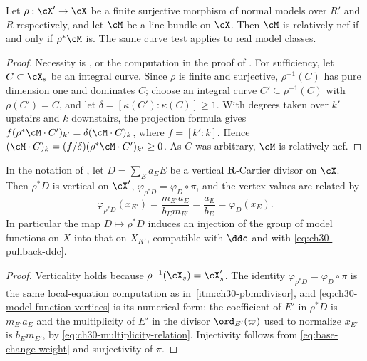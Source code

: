 \begin{lemma}
\label{lem:ch30-semipositivity-descends}
Let $\rho:\cX'\to\cX$ be a finite surjective morphism of normal models
over $R'$ and $R$ respectively, and let $\cM$ be a line bundle on
$\cX$.  Then $\cM$ is relatively nef if and only if $\rho^*\cM$ is.
The same curve test applies to real model classes.
\end{lemma}

\begin{proof}
Necessity is , or the computation in the proof of
.  For sufficiency, let
$C\subset\cX_s$ be an integral curve.  Since $\rho$ is finite and
surjective, $\rho^{-1}(C)$ has pure dimension one and dominates $C$;
choose an integral curve $C'\subseteq\rho^{-1}(C)$ with
$\rho(C')=C$, and let $\delta=[\kappa(C'):\kappa(C)]\geq1$.  With degrees taken over $k'$ upstairs and $k$ downstairs, the
projection formula gives
$f(\rho^*\cM\cdot C')_{k'}=\delta(\cM\cdot C)_k$,
where $f=[k':k]$.  Hence
$(\cM\cdot C)_k=(f/\delta)(\rho^*\cM\cdot C')_{k'}\geq0$.  As $C$ was
arbitrary, $\cM$ is relatively nef.
\end{proof}

\begin{lemma}
\label{lem:ch30-base-change-model-function}
In the notation of , let
$D=\sum_Ea_EE$ be a vertical $\mathbf R$-Cartier divisor on $\cX$.
Then $\rho^*D$ is vertical on $\cX'$,
$\varphi_{\rho^*D}=\varphi_D\circ\pi$, and the vertex values are related
by
\begin{equation}
\label{eq:ch30-model-function-vertices}
 \varphi_{\rho^*D}(x_{E'})=\frac{m_{E'}a_E}{b_Em_{E'}}
                          =\frac{a_E}{b_E}=\varphi_D(x_E).
\end{equation}
In particular the map $D\mapsto\rho^*D$ induces an injection of the group
of model functions on $X$ into that on $X_{K'}$, compatible with
$\ddc$ and with \eqref{eq:ch30-pullback-ddc}.
\end{lemma}

\begin{proof}
Verticality holds because $\rho^{-1}(\cX_s)=\cX'_s$.  The identity
$\varphi_{\rho^*D}=\varphi_D\circ\pi$ is the same local-equation
computation as in
\,\cref{itm:ch30-pbm:divisor}, and
\eqref{eq:ch30-model-function-vertices} is its numerical form: the
coefficient of $E'$ in $\rho^*D$ is $m_{E'}a_E$ and the multiplicity
of $E'$ in the divisor $\ord_{E'}(\varpi)$ used to normalize
$x_{E'}$ is $b_Em_{E'}$, by
\eqref{eq:ch30-multiplicity-relation}.  Injectivity follows from
\eqref{eq:base-change-weight} and surjectivity of $\pi$.
\end{proof}

